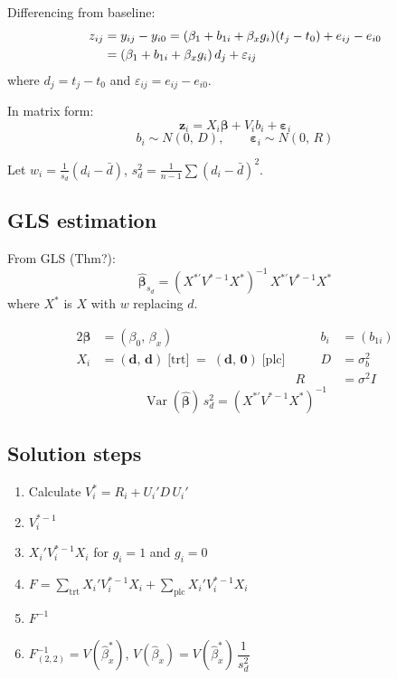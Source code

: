 \documentclass[11pt]{article}
\newcommand{\Var}{\operatorname{Var}}
\newcommand{\trt}{\text{trt}}
\newcommand{\plc}{\text{plc}}
\begin{document}
Differencing from baseline:
\begin{align}
  z_{ij}
  &= y_{ij} - y_{i0}
   = (\beta_1 + b_{1i} + \beta_x g_i)(t_j - t_0)
     + e_{ij} - e_{i0} \notag \\
  &= (\beta_1 + b_{1i} + \beta_x g_i)\,d_j + \varepsilon_{ij}
\end{align}
where $d_j = t_j - t_0$ and
$\varepsilon_{ij} = e_{ij} - e_{i0}$.

In matrix form:
\begin{equation}
  \mathbf{z}_i = X_i \bm{\beta} + V_i b_i + \bm{\varepsilon}_i
\end{equation}
\[
  b_i \sim N(0,\, D), \qquad
  \bm{\varepsilon}_i \sim N(0,\, R)
\]

Let $w_i = \frac{1}{s_d}(d_i - \bar{d})$, \quad
$s_d^2 = \frac{1}{n-1}\sum(d_i - \bar{d})^2$.

\subsection*{GLS estimation}

From GLS (Thm?):
\begin{equation}
  \hat{\bm{\beta}}_{s_d}
  = (X^{*\prime} V^{*-1} X^*)^{-1}\,
    X^{*\prime} V^{*-1} X^*
\end{equation}
where $X^*$ is $X$ with $w$ replacing $d$.

\begin{alignat*}{2}
  \bm{\beta} &= (\beta_0,\, \beta_x) &\qquad
  b_i &= (b_{1i}) \\
  X_i &= (\mathbf{d},\, \mathbf{d})\;\text{[trt]}
   \;=\; (\mathbf{d},\, \mathbf{0})\;\text{[plc]}
  &\qquad
  D &= \sigma_b^2 \\
  && R &= \sigma^2 I
\end{alignat*}
\[
  \Var(\hat{\bm{\beta}})\,s_d^2
  = (X^{*\prime} V^{*-1} X^*)^{-1}
\]

\subsection*{Solution steps}

\begin{enumerate}
  \item Calculate $V_i^* = R_i + U_i' D\, U_i'$
  \item $V_i^{*-1}$
  \item $X_i' V_i^{*-1} X_i$ for $g_i = 1$
    and $g_i = 0$
  \item $F = \displaystyle\sum_{\trt}
    X_i' V_i^{*-1} X_i
    + \sum_{\plc} X_i' V_i^{*-1} X_i$
  \item $F^{-1}$
  \item $F^{-1}_{(2,2)} = V(\hat{\beta}_x^*)$, \quad
    $V(\hat{\beta}_x) = V(\hat{\beta}_x^*)\,
    \dfrac{1}{s_d^2}$
\end{enumerate}
\end{document}
